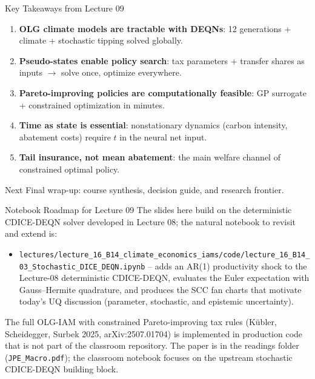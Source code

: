 \documentclass[aspectratio=169,11pt]{beamer}
\begin{document}
\begin{frame}{Key Takeaways from Lecture 09}
\begin{enumerate}
    \item \textbf{OLG climate models are tractable with DEQNs}: 12 generations + climate + stochastic tipping solved globally.
    \item \textbf{Pseudo-states enable policy search}: tax parameters + transfer shares as inputs $\rightarrow$ solve once, optimize everywhere.
    \item \textbf{Pareto-improving policies are computationally feasible}: GP surrogate + constrained optimization in minutes.
    \item \textbf{Time as state is essential}: nonstationary dynamics (carbon intensity, abatement costs) require $t$ in the neural net input.
    \item \textbf{Tail insurance, not mean abatement}: the main welfare channel of constrained optimal policy.
\end{enumerate}

\vspace{0.2cm}
\begin{block}{Next}
Final wrap-up: course synthesis, decision guide, and research frontier.
\end{block}
\end{frame}

\begin{frame}{Notebook Roadmap for Lecture 09}
\small
The slides here build on the deterministic CDICE-DEQN solver developed in Lecture 08; the natural notebook to revisit and extend is:
\vspace{0.2cm}
\begin{itemize}
    \item \texttt{lectures/lecture\_16\_B14\_climate\_economics\_iams/code/lecture\_16\_B14\_03\_Stochastic\_DICE\_DEQN.ipynb} -- adds an AR(1) productivity shock to the Lecture-08 deterministic CDICE-DEQN, evaluates the Euler expectation with Gauss--Hermite quadrature, and produces the SCC fan charts that motivate today's UQ discussion (parameter, stochastic, and epistemic uncertainty).
\end{itemize}
\vspace{0.2cm}
The full OLG-IAM with constrained Pareto-improving tax rules (K\"ubler, Scheidegger, Surbek 2025, arXiv:2507.01704) is implemented in production code that is not part of the classroom repository.  The paper is in the readings folder (\texttt{JPE\_Macro.pdf}); the classroom notebook focuses on the upstream stochastic CDICE-DEQN building block.
\end{frame}
\end{document}
